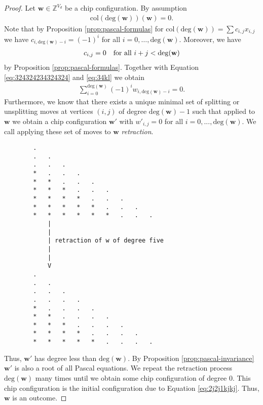 \begin{proof}
    Let \( \mathbf{w}\in \mathbb{Z}^{V_d} \) be a chip configuration.
    By assumption
    \begin{align}\label{eq:324324234324324}
        \mathrm{col}(\mathrm{deg}(\mathbf w))(\mathbf w) = 0.
    \end{align}
    Note that by Proposition \ref{prop:pascal-formulas} for \( \mathrm{col}(\mathrm{deg}(\mathbf w)) = \sum c_{i,j} x_{i,j}\) we have \( c_{i,\mathrm{deg}(\mathbf w) - i} = (-1)^{i} \) for all \( i =0, \dots, \mathrm{deg}(\mathbf w) \). Moreover, we have 
    \begin{align}\label{eq:34kl}
        c_{i,j} = 0 \quad \text{for all \( i+j < \mathrm{deg}(\mathbf w) \)}
    \end{align}
     by Proposition \ref{prop:pascal-formulas}. Together with Equation \ref{eq:324324234324324} and \ref{eq:34kl} we obtain 
    \begin{align}\label{eq:2j2j1kjkj}
        \sum_{i=0}^{\mathrm{deg}(\mathbf w)}(-1)^i w_{i, \mathrm{deg}(\mathbf w) - i} = 0.
    \end{align}
    Furthermore, we know that there exists a unique minimal set of splitting or unsplitting moves at vertices \( (i,j) \) of degree \( \mathrm{deg}(\mathbf w) - 1 \) such that applied to \( \mathbf w \) we obtain a chip configuration \( \mathbf w' \) with \( w'_{i,j} = 0 \) for all \( i =0, ... , \mathrm{deg}(\mathbf w) \). We call applying these set of moves to \( \mathbf w \) \emph{retraction}.
    
    \begin{verbatim}
        .
        .   .
        .   .   .
        *   .   .   .
        *   *   .   .   .
        *   *   *   .   .   .
        *   *   *   *   .   .   .
        *   *   *   *   *   .   .   .
        *   *   *   *   *   *   .   .   .
            |
            |
            | retraction of w of degree five
            |
            |
            V
        .
        .   .
        .   .   .
        .   .   .   .
        *   .   .   .   .
        *   *   .   .   .   .
        *   *   *   .   .   .   .
        *   *   *   *   .   .   .   .
        *   *   *   *   *   .   .   .   .
    \end{verbatim}
    Thus, \( \mathbf w' \) has degree less than \( \mathrm{deg}(\mathbf w) \).
    By Proposition \ref{prop:pascal-invariance} \( \mathbf w' \) is also a root of all Pascal equations. We repeat the retraction process \( \mathrm{deg}(\mathbf w) \) many times until we obtain some chip configuration of degree \( 0 \). This chip configuration is the initial configuration due to Equation \ref{eq:2j2j1kjkj}. Thus, \( \mathbf w \) is an outcome.
\end{proof}


